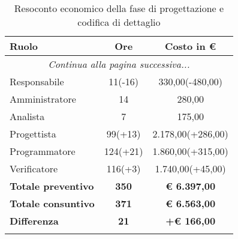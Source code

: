 \documentclass[../piano_di_progetto.tex]{subfiles}
\begin{document}
\begin{center}
	\begin{longtable}{|l|c|c|}
		\hline
		\rowcolor{lightgray}
		\textbf{Ruolo} & \textbf{Ore} & \textbf{Costo in €}\\
		\hline
		\endhead
		
		\hline
		\multicolumn{3}{|c|}{\emph{Continua alla pagina successiva...}}\\
		\hline
		\endfoot

		\endlastfoot
		Responsabile & 	 11(-16) 	 & 330,00(-480,00) \\
		Amministratore & 14 	 & 280,00 \\
		Analista & 		7 	 & 175,00 \\
		Progettista &    99(+13)   & 2.178,00(+286,00) \\
		Programmatore &  124(+21)   & 1.860,00(+315,00) \\
		Verificatore &   116(+3)  & 1.740,00(+45,00) \\
		\hline
		\textbf{Totale preventivo} & \textbf{350} & \textbf{€ 6.397,00} \\
		\hline
		\textbf{Totale consuntivo} & \textbf{371} & \textbf{€ 6.563,00} \\
		\hline
		\textbf{Differenza} & \textbf{21} & \textbf{+€ 166,00}\\
		\hline
		\rowcolor{white}
		\caption{Resoconto economico della fase di progettazione e codifica di dettaglio}
	\end{longtable}
\end{center}
\end{document}
